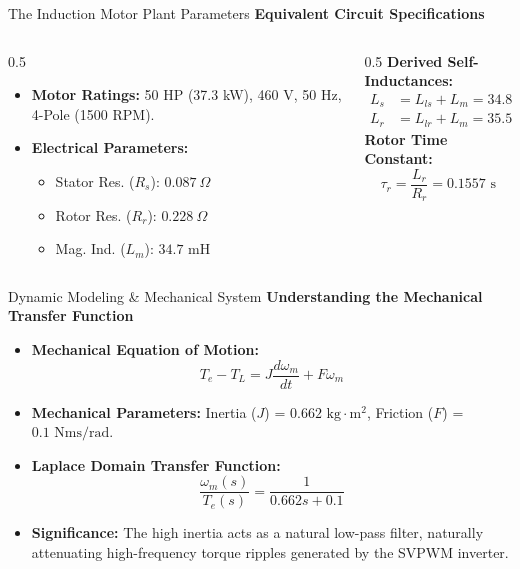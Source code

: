 \documentclass[aspectratio=169]{beamer}
\begin{document}
\begin{frame}{The Induction Motor Plant Parameters}
    \textbf{Equivalent Circuit Specifications}
    \begin{columns}
        \begin{column}{0.5\textwidth}
            \begin{itemize}
                \item \textbf{Motor Ratings:} 50 HP (37.3 kW), 460 V, 50 Hz, 4-Pole (1500 RPM).
                \item \textbf{Electrical Parameters:}
                \begin{itemize}
                    \item Stator Res. ($R_s$): $0.087\ \Omega$
                    \item Rotor Res. ($R_r$): $0.228\ \Omega$
                    \item Mag. Ind. ($L_m$): $34.7\text{ mH}$
                \end{itemize}
            \end{itemize}
        \end{column}
        \begin{column}{0.5\textwidth}
            \textbf{Derived Self-Inductances:}
            \begin{align*}
                L_s &= L_{ls} + L_m = 34.8\text{ mH} \\
                L_r &= L_{lr} + L_m = 35.5\text{ mH}
            \end{align*}
            \textbf{Rotor Time Constant:}
            \begin{equation*}
                \tau_r = \frac{L_r}{R_r} = 0.1557\text{ s}
            \end{equation*}
        \end{column}
    \end{columns}
\end{frame}

\begin{frame}{Dynamic Modeling \& Mechanical System}
    \textbf{Understanding the Mechanical Transfer Function}
    \vspace{0.3cm}
    \begin{itemize}
        \item \textbf{Mechanical Equation of Motion:} 
        $$T_e - T_L = J\frac{d\omega_m}{dt} + F\omega_m$$
        \item \textbf{Mechanical Parameters:} Inertia ($J$) = $0.662\text{ kg}\cdot\text{m}^2$, Friction ($F$) = $0.1\text{ Nms/rad}$.
        \item \textbf{Laplace Domain Transfer Function:}
        $$\frac{\omega_m(s)}{T_e(s)} = \frac{1}{0.662s + 0.1}$$
        \item \textbf{Significance:} The high inertia acts as a natural low-pass filter, naturally attenuating high-frequency torque ripples generated by the SVPWM inverter.
    \end{itemize}
\end{frame}
\end{document}
